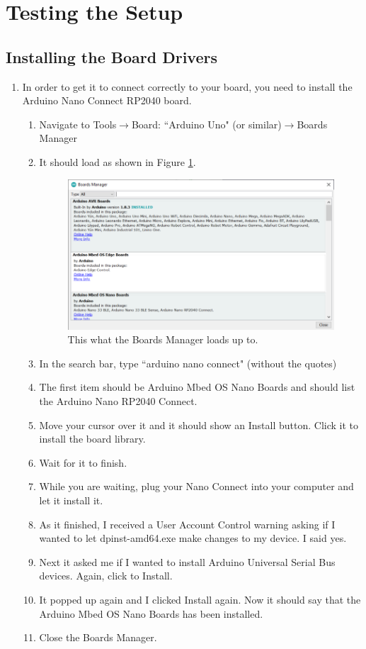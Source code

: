 \section{Testing the Setup}
\subsection{Installing the Board Drivers}
\begin{enumerate}
	\item In order to get it to connect correctly to your board, you need to install the Arduino Nano Connect RP2040 board.
	\begin{enumerate}
		\item Navigate to Tools$\rightarrow$Board: ``Arduino Uno" (or similar)$\rightarrow$Boards Manager
		\item It should load as shown in Figure \ref{fig:boardsManager}.
        \begin{figure}[!htb]
            \centering
            \includegraphics[scale=0.9]{arduinoStart/BoardsManager.PNG}
            \caption{This what the Boards Manager loads up to.}
            \label{fig:boardsManager}
        \end{figure} 
        \item In the search bar, type ``arduino nano connect" (without the quotes)
		\item The first item should be Arduino Mbed OS Nano Boards and should list the Arduino Nano RP2040 Connect.
		\item Move your cursor over it and it should show an Install button. Click it to install the board library.
		\item Wait for it to finish.
		\item While you are waiting, plug your Nano Connect into your computer and let it install it.
		\item As it finished, I received a User Account Control warning asking if I wanted to let dpinst-amd64.exe make changes to my device. I said yes.
		\item Next it asked me if I wanted to install Arduino Universal Serial Bus devices. Again, click to Install.
		\item It popped up again and I clicked Install again. Now it should say that the Arduino Mbed OS Nano Boards has been installed.
		\item Close the Boards Manager.
	\end{enumerate}
\end{enumerate}

